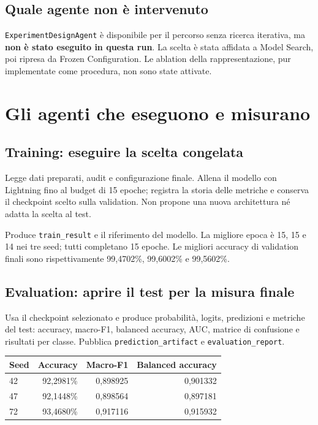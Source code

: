 \documentclass[11pt,a4paper]{article}
\newcommand{\artefatto}[1]{\nolinkurl{#1}}
\begin{document}
\subsection{Quale agente non è intervenuto}
\artefatto{ExperimentDesignAgent} è disponibile per il percorso senza
ricerca iterativa, ma \textbf{non è stato eseguito in questa run}. La scelta
è stata affidata a Model Search, poi ripresa da Frozen Configuration.
Le ablation della rappresentazione, pur implementate come procedura,
non sono state attivate.

\section{Gli agenti che eseguono e misurano}

\subsection{Training: eseguire la scelta congelata}
Legge dati preparati, audit e configurazione finale. Allena il modello con
Lightning fino al budget di 15 epoche; registra la storia delle metriche
e conserva il checkpoint scelto sulla validation. Non propone una nuova
architettura né adatta la scelta al test.

Produce \artefatto{train_result} e il riferimento del modello.
La migliore epoca è 15, 15 e 14 nei tre seed; tutti completano 15 epoche.
Le migliori accuracy di validation finali sono rispettivamente
99,4702\%, 99,6002\% e 99,5602\%.

\subsection{Evaluation: aprire il test per la misura finale}
Usa il checkpoint selezionato e produce probabilità, logits, predizioni
e metriche del test: accuracy, macro-F1, balanced accuracy, AUC,
matrice di confusione e risultati per classe. Pubblica
\artefatto{prediction_artifact} e \artefatto{evaluation_report}.

\begin{center}
\begin{tabular}{@{}lrrr@{}}
\toprule
\textbf{Seed} & \textbf{Accuracy} & \textbf{Macro-F1} & \textbf{Balanced accuracy}\\
\midrule
42 & 92,2981\% & 0,898925 & 0,901332\\
47 & 92,1448\% & 0,898564 & 0,897181\\
72 & 93,4680\% & 0,917116 & 0,915932\\
\bottomrule
\end{tabular}
\end{center}
\end{document}
